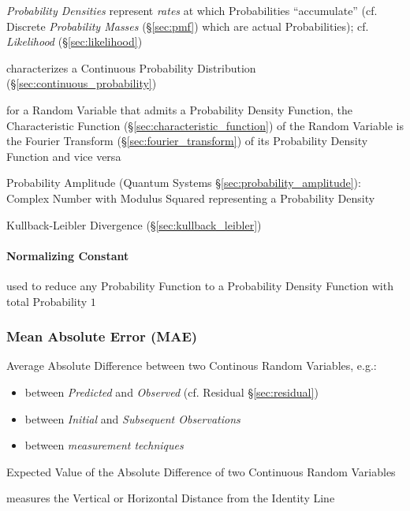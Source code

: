 \emph{Probability Densities} represent \emph{rates} at which Probabilities
``accumulate'' (cf. Discrete \emph{Probability Masses} (\S\ref{sec:pmf}) which
are actual Probabilities); cf. \emph{Likelihood} (\S\ref{sec:likelihood})

characterizes a Continuous Probability Distribution
(\S\ref{sec:continuous_probability})

for a Random Variable that admits a Probability Density Function, the
Characteristic Function (\S\ref{sec:characteristic_function}) of the Random
Variable is the Fourier Transform (\S\ref{sec:fourier_transform}) of its
Probability Density Function and vice versa

\fist Probability Amplitude (Quantum Systems \S\ref{sec:probability_amplitude}):
Complex Number with Modulus Squared representing a Probability Density

\fist Kullback-Leibler Divergence (\S\ref{sec:kullback_leibler})



\paragraph{Normalizing Constant}\label{sec:normalizing_constant}\hfill

used to reduce any Probability Function to a Probability Density Function with
total Probability $1$




\subsubsection{Mean Absolute Error (MAE)}\label{sec:mae}

Average Absolute Difference between two Continous Random Variables, e.g.:
\begin{itemize}
  \item between \emph{Predicted} and \emph{Observed} (cf. Residual
    \S\ref{sec:residual})
  \item between \emph{Initial} and \emph{Subsequent Observations}
  \item between \emph{measurement techniques}
\end{itemize}

Expected Value of the Absolute Difference of two Continuous Random Variables

measures the Vertical or Horizontal Distance from the Identity Line

